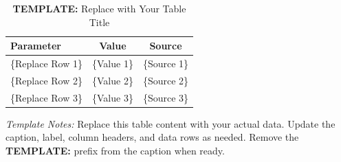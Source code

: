 \documentclass{econsocart}
\begin{document}

\begin{table}[h]
  \centering
  \caption{{\bf TEMPLATE:} Replace with Your Table Title\label{tab:template}}
  \begin{tabular}{lcc}
    \hline
    \textbf{Parameter} & \textbf{Value} & \textbf{Source} \\
    \hline
    \{Replace Row 1\}  & \{Value 1\}    & \{Source 1\}    \\
    \{Replace Row 2\}  & \{Value 2\}    & \{Source 2\}    \\
    \{Replace Row 3\}  & \{Value 3\}    & \{Source 3\}    \\
    \hline
  \end{tabular}
  \begin{flushleft}
    \footnotesize
    \textit{Template Notes:} Replace this table content with your actual data.
    Update the caption, label, column headers, and data rows as needed.
    Remove the {\bf TEMPLATE:} prefix from the caption when ready.
  \end{flushleft}
\end{table}
\end{document}
